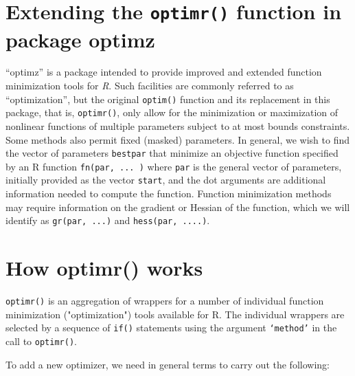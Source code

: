 \documentclass[10pt]{article}
\let\code=\texttt
\let\proglang=\textsf
\newcommand{\pkg}[1]{{\fontseries{b}\selectfont #1}}
\begin{document}


\section{Extending the \code{optimr()} function in package \pkg{optimz}}
``\pkg{optimz}'' is a package intended to provide improved and extended 
function minimization tools for \emph{R}. Such facilities are
commonly referred to as ``optimization'', but the original \texttt{optim()}
function and its replacement in this package, that is, \texttt{optimr()},
only allow for the minimization or maximization of nonlinear functions of
multiple parameters subject to at most bounds constraints. Some methods
also permit fixed (masked) parameters. In general, we wish to find the
vector of parameters \code{bestpar} that minimize an objective function specified by an
\proglang{R} function \code{fn(par, ... )} where \code{par} is the general
vector of parameters, initially provided as the vector \code{start}, and 
the dot arguments are additional information needed to compute the function.
Function minimization methods may require information on the gradient or 
Hessian of the function, which we will identify as \code{gr(par, ...)}
and \code{hess(par, ....)}. 



\section{How optimr() works}

\code{optimr()} is an aggregation of wrappers for a number of individual function
minimization ("optimization") tools available for \proglang{R}. The individual
wrappers are selected by a sequence of \code{if()} statements using the argument
\code{`method'} in the call to \code{optimr()}. 

To add a new optimizer, we need in general terms to carry out the following:
\end{document}
